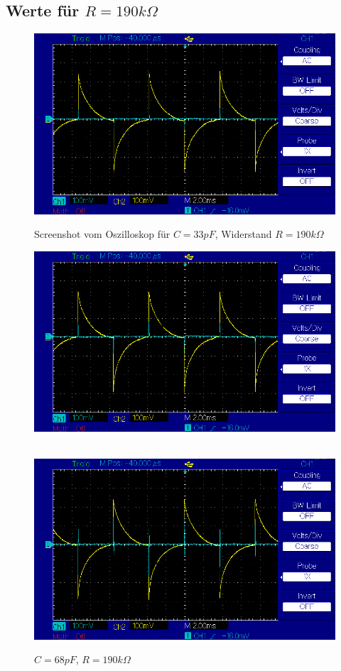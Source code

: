 \documentclass{article}
\begin{document}
\newpage
\subsection{Werte für $R = 190k\Omega$}

\begin{figure}[!h]
        \centering
        \includegraphics[width=\linewidth]{figures/results/resistor_190_Ohm/c33pF.png}
        \caption{Screenshot vom Oszilloskop für $C = 33pF$, Widerstand $R = 190k\Omega$}
        \label{img:c33e0_r190}
    \endminipage\hfill
        \centering
        \includegraphics[width=\linewidth]{figures/results/resistor_190_Ohm/c68pF.png}
        \caption{$C = 68 pF$, $R = 190 k\Omega$}
        \label{img:c68e0_r190}
    \endminipage\hfill \\
        \centering
        \includegraphics[width=\linewidth]{figures/results/resistor_190_Ohm/c330pF.png}

\end{figure}
\end{document}
